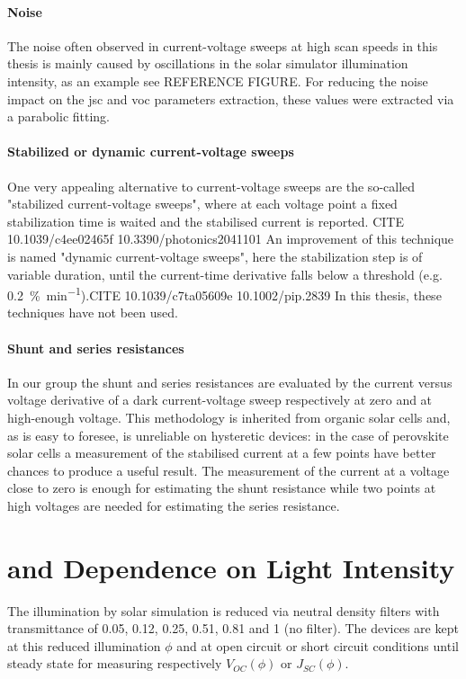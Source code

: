 \paragraph{Noise} The noise often observed in current-voltage sweeps at high scan speeds in this thesis is mainly caused by oscillations in the solar simulator illumination intensity, as an example see REFERENCE FIGURE. For reducing the noise impact on the \gls{jsc} and \gls{voc} parameters extraction, these values were extracted via a parabolic fitting. %

\paragraph{Stabilized or dynamic current-voltage sweeps} One very appealing alternative to current-voltage sweeps are the so-called "stabilized current-voltage sweeps", where at each voltage point a fixed stabilization time is waited and the stabilised current is reported. CITE 10.1039/c4ee02465f 10.3390/photonics2041101
An improvement of this technique is named "dynamic current-voltage sweeps", here the stabilization step is of variable duration, until the current-time derivative falls below a threshold (e.g. \SI{0.2}{\%\per\minute}).CITE 10.1039/c7ta05609e 10.1002/pip.2839
In this thesis, these techniques have not been used.

\paragraph{Shunt and series resistances} \label{resistances} In our group the shunt and series resistances are evaluated by the current versus voltage derivative of a dark current-voltage sweep respectively at zero and at high-enough voltage. This methodology is inherited from organic solar cells and, as is easy to foresee, is unreliable on hysteretic devices: in the case of perovskite solar cells a measurement of the stabilised current at a few points have better chances to produce a useful result. The measurement of the current at a voltage close to zero is enough for estimating the shunt resistance while two points at high voltages are needed for estimating the series resistance.

\section{ and  Dependence on Light Intensity}
The illumination by solar simulation is reduced via neutral density filters with transmittance of 0.05, 0.12, 0.25, 0.51, 0.81 and 1 (no filter). The devices are kept at this reduced illumination $\phi$ and at open circuit or short circuit conditions until steady state for measuring respectively $V_{OC}(\phi)$ or $J_{SC}(\phi)$.

